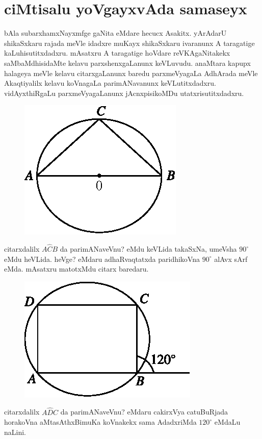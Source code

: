 \chapter{ciMtisalu yoVgayxvAda samaseyx} 

bAla subarxhamxNayxmfge gaNita eMdare hecucx Asakitx. yArAdarU shikaSxkaru rajada meVle idadxre muKayx shikaSxkaru ivaranunx A taragatige kaLuhisutitxdadxru. mAsatxru A taragatige hoVdare reVKAgaNitakekx saMbaMdhisidaMte kelavu parxshenxgaLanunx keVLuvudu. anaMtara kapupx halageya meVle kelavu citarxgaLanunx baredu parxmeVyagaLa AdhArada meVle Akaqtiyalilx kelavu koVnagaLa parimANavanunx keVLutitxdadxru. vidAyxthiRgaLu parxmeVyagaLanunx jAcnxpisikoMDu utatxrisutitxdadxru.
\begin{figure}[H]
\centering
\includegraphics[scale=0.7]{src/figures/m_179a.eps} 
\end{figure}
citarxdalilx $A\widehat{C}B$ da parimANaveVnu? eMdu keVLida takaSxNa, umeVsha $90^\circ$ eMdu heVLida. heVge? eMdaru adhaRvaqtatxda paridhikoVna $90^\circ$ alAvx sArf eMda. mAsatxru matotxMdu citarx baredaru.
\begin{figure}[H]
\centering
\includegraphics[scale=0.7]{src/figures/m_179b.eps} 
\end{figure}
citarxdalilx $A\widehat{D}C$ da parimANaveVnu? eMdaru cakirxVya catuBuRjada hora\-koVna aMtasAthxBimuKa koVnakekx sama AdadxriMda $120^\circ$ eMdaLu naLini.
